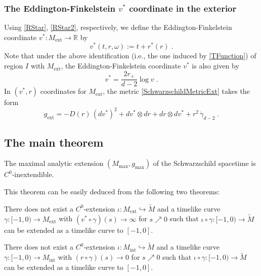 \documentclass[reqno]{article}
\newcommand{\R}{\mathbb{R}}
\newcommand{\Mint}{M_{\mathrm{int}}}
\newcommand{\Mext}{M_{\mathrm{ext}}}
\newcommand{\gext}{g_{\mathrm{ext}}}
\newcommand{\Mmax}{M_{\mathrm{max}}}
\newcommand{\gmax}{g_{\mathrm{max}}}
\begin{document}
\subsubsection*{The Eddington-Finkelstein $v^*$ coordinate in the exterior}

Using \eqref{RStar}, \eqref{RStar2}, respectively, we define the Eddington-Finkelstein coordinate $v^* : \Mext \to \R$ by
\begin{equation*}
v^*(t,r, \omega) := t + r^*(r)\;.
\end{equation*}
Note that under the above identification (i.e., the one induced by \eqref{TFunction}) of region $I$ with $\Mext$, the Eddington-Finkelstein coordinate $v^*$ is also given by 
\begin{equation}
\label{VRel}
v^* = \frac{2r_+}{d-2} \log v\;. 
\end{equation}
In $(v^*, r)$ coordinates for $\Mext$, the metric \eqref{SchwarzschildMetricExt} takes the form
\begin{equation}
\label{MetricEd}
\gext = -D(r) \, (dv^*)^2 + dv^* \otimes dr + dr \otimes dv^* + r^2 \, \mathring{\gamma}_{d-2} \;.
\end{equation} 






\subsection{The main theorem}

\begin{theorem}\label{schwthm:MainThm}
\label{MainThm}
The maximal analytic extension $(\Mmax, \gmax)$ of the Schwarzschild spacetime is $C^0$-inextendible.
\end{theorem}

This theorem can be easily deduced from the following two theorems:

\begin{theorem}\label{schwthm:Exterior}
\label{Exterior}
There does not exist a $C^0$-extension $\iota : \Mext \hookrightarrow \tilde{M}$  and a timelike curve $\gamma : [-1, 0) \to \Mext$ with $(v^* \circ \gamma)(s) \to \infty$ for $s \nearrow 0$ such that $\iota \circ \gamma : [-1,0) \to \tilde{M}$ can be extended as a timelike curve to $[-1,0]$.
\end{theorem}

\begin{theorem}\label{schwthm:Inex}
\label{Inex}
There does not exist a $C^0$-extension $\iota : \Mint \hookrightarrow \tilde{M}$  and a timelike curve $\gamma : [-1, 0) \to \Mint$ with $(r \circ \gamma)(s) \to 0$ for $s \nearrow 0$ such that $\iota \circ \gamma : [-1,0) \to \tilde{M}$ can be extended as a timelike curve to $[-1,0]$.
\end{theorem}
\end{document}
